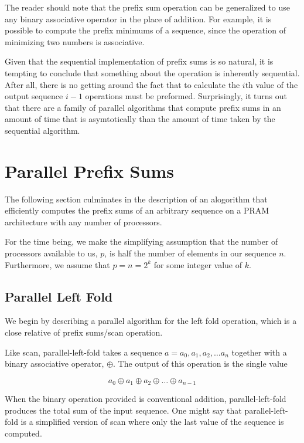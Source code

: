 \documentclass[12pt,twoside]{reedthesis}
\begin{document}
The reader should note that the prefix sum operation can be
generalized to use any binary associative operator in the place of
addition. For example, it is possible to compute the prefix minimums
of a sequence, since the operation of minimizing two numbers is associative.

Given that the sequential implementation of prefix sums is so natural,
it is tempting to conclude that something about the operation is
inherently sequential. After all, there is no getting around the fact
that to calculate the $i$th value of the output sequence
$i-1$ operations must be preformed. Surprisingly, it turns out that
there are a family of parallel algorithms that compute prefix sums in
an amount of time that is asymtotically than the amount of
time taken by the sequential algorithm.


\section{Parallel Prefix Sums}

The following section culminates in the description of an alogorithm
that efficiently computes the prefix sums of an arbitrary sequence on
a PRAM architecture with any number of processors.

For the time being, we make the simplifying assumption that the number of processors available to us, $p$, is half the number of elements in our sequence $n$. Furthermore, we assume that $p=n=2^k$ for some integer value of $k$.

\vspace{1pc}
\subsection{Parallel Left Fold}
We begin by describing a parallel algorithm for the left fold operation, which is a close relative of prefix sums/scan operation.

Like scan, parallel-left-fold takes a sequence $a = a_0, a_1, a_2, \ldots a_n$ together with a binary associative operator, $\oplus$. The output of this operation is the single value

$$a_0 \oplus a_1 \oplus a_2 \oplus \ldots \oplus a_{n-1}$$

When the binary operation provided is conventional addition, parallel-left-fold produces the total sum of the input sequence. One might say that parallel-left-fold is a simplified version of scan where only the last value of the sequence is computed.
\vspace{.5pc}
\end{document}
